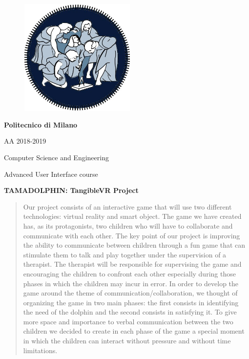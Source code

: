 \documentclass [12pt]{article}
\begin{document}
\begin{figure}[ht!]
\centering
\includegraphics[height=5.8cm,width=5.8cm]{logopoli.jpg}
\end{figure}
\begin{large}
\centerline{\textbf{Politecnico di Milano} }
\centerline{AA 2018-2019}
\vspace{0.5cm}
\centerline{Computer Science and Engineering}
\vspace{0.5cm}
\centerline{Advanced User Interface course}
\centerline{\textbf{TAMADOLPHIN: TangibleVR Project}}
\vspace{1cm}
\end{large}
\vspace{0.5cm}

\begin{abstract}
Our project consists of an interactive game that will use two different technologies: virtual reality and smart object. The game we have created has, as its protagonists, two children who will have to collaborate and communicate with each other. The key point of our project is improving the ability to communicate between children through a fun game that can stimulate them to talk and play together under the supervision of a therapist. The therapist will be responsible for supervising the game and encouraging the children to confront each other especially during those phases in which the children may incur in error. In order to develop the game around the theme of communication/collaboration, we thought of organizing the game in two main phases: the first consists in identifying the need of the dolphin and the second consists in satisfying it. To give more space and importance to verbal communication between the two children we decided to create in each phase of the game a special moment in which the children can interact without pressure and without time limitations.
\end{abstract}
\end{document}
